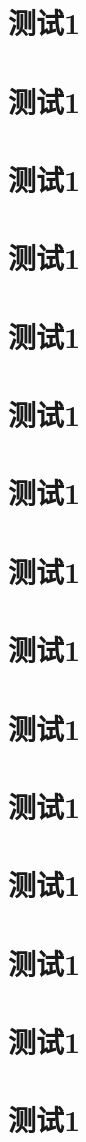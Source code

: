 \documentclass{ctexart}
\begin{document}
\section{测试1}\section{测试1}\section{测试1}\section{测试1}\section{测试1}
\section{测试1}\section{测试1}\section{测试1}\section{测试1}\section{测试1}
\section{测试1}\section{测试1}\section{测试1}\section{测试1}\section{测试1}
\end{document}
